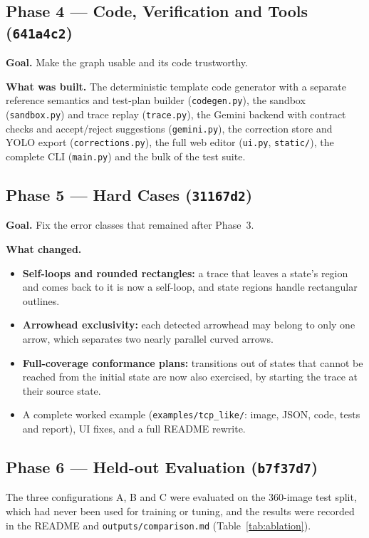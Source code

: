 \documentclass[journal,10pt]{IEEEtran}
\newcommand{\code}[1]{\texttt{#1}}
\begin{document}
\subsection{Phase 4 --- Code, Verification and Tools (\code{641a4c2})}
\textbf{Goal.} Make the graph usable and its code trustworthy.

\textbf{What was built.} The deterministic template code generator with a separate
reference semantics and test-plan builder (\code{codegen.py}), the sandbox
(\code{sandbox.py}) and trace replay (\code{trace.py}), the Gemini backend with
contract checks and accept/reject suggestions (\code{gemini.py}), the correction store
and YOLO export (\code{corrections.py}), the full web editor (\code{ui.py},
\code{static/}), the complete CLI (\code{main.py}) and the bulk of the test suite.

\subsection{Phase 5 --- Hard Cases (\code{31167d2})}
\textbf{Goal.} Fix the error classes that remained after Phase~3.

\textbf{What changed.}
\begin{itemize}
\item \textbf{Self-loops and rounded rectangles:} a trace that leaves a state's region
and comes back to it is now a self-loop, and state regions handle rectangular outlines.
\item \textbf{Arrowhead exclusivity:} each detected arrowhead may belong to only one
arrow, which separates two nearly parallel curved arrows.
\item \textbf{Full-coverage conformance plans:} transitions out of states that cannot be
reached from the initial state are now also exercised, by starting the trace at their
source state.
\item A complete worked example (\code{examples/tcp\_like/}: image, JSON, code, tests and
report), UI fixes, and a full README rewrite.
\end{itemize}

\subsection{Phase 6 --- Held-out Evaluation (\code{b7f37d7})}
The three configurations A, B and C were evaluated on the 360-image test split, which had
never been used for training or tuning, and the results were recorded in the README and
\code{outputs/comparison.md} (Table~\ref{tab:ablation}).
\end{document}
